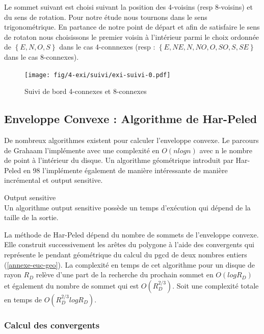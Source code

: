 Le sommet suivant est choisi suivant la position des 4-voisins (resp 8-voisins) et du sens de rotation. Pour notre étude nous tournons dans le sens trigonométrique. En partance de notre point de départ et afin de satisfaire le sens de rotaton nous choisissons le premier voisin à l'intérieur parmi le choix ordonnée de $\left\{E, N, O, S\right\}$ dans le cas 4-connnexes (resp :  $\left\{E, NE, N, NO, O, SO, S, SE \right\}$ dans le cas 8-connexes).

\begin{figure}[H]
  \centering
  \texttt{[image: fig/4-exi/suivi/exi-suivi-0.pdf]}
  \caption{Suivi de bord 4-connexes et 8-connexes}
\end{figure}
  

\subsection{Enveloppe Convexe : Algorithme de Har-Peled}

De nombreux algorithmes existent pour calculer l'enveloppe convexe. Le parcours de Grahaam l'implémente avec une complexité en $O(n log n)$ avec n le nombre de point à l'intérieur du disque. Un algorithme géométrique introduit par Har-Peled en 98 l'implémente également de manière intéressante de manière incrémental et output sensitive.


\begin{Definition}{Output sensitive}\\
\label{def:os}
      Un algorithme output sensitive possède un temps d’exécution qui dépend de la taille de la sortie.
\end{Definition}

La méthode de Har-Peled dépend du nombre de sommets de l'enveloppe convexe. Elle construit successivement les arêtes du polygone à l'aide des convergents qui représente le pendant géométrique du calcul du pgcd de deux nombres entiers (\ref{annexe-euc-geo}). La complexité en temps de cet algorithme pour un disque de rayon $R_D$ relève d'une part de la recherche du prochain sommet en $O(log R_D)$ et également du nombre de sommet qui est $O(R_{D}^{2/3})$. Soit une complexité totale en temps de $O( R_{D}^{2/3} log R_D)$.

\subsubsection{Calcul des convergents}

